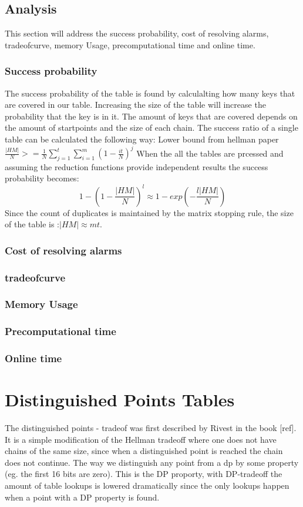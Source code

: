 {\subsection*{Analysis}
This section will address the success probability, cost of resolving alarms, tradeofcurve, memory Usage, precomputational time and online time.


\subsubsection*{Success probability}
The success probability of the table is found by calculalting how many keys that are covered in our table. Increasing the size of the table will increase the probability that the key is in it. The amount of keys that are covered depends on the amount of startpoints and the size of each chain. The success ratio of a single table can be calculated the following way:
Lower bound from hellman paper
$\frac{|HM|}{N}>=\frac{1}{N}\sum^{t}_{j=1}\sum^{m}_{i=1}(1-\frac{it}{N})^{j} $
When the all the tables are prcessed and assuming the reduction functions provide independent results the success probability becomes:
\[1-(1-\frac{|HM|}{N})^l\approx 1- exp(-\frac{l|HM|}{N})\]
Since the count of duplicates is maintained by the matrix stopping rule, the size of the table is :$|HM|\approx mt$.
\subsubsection{Cost of resolving alarms}
\subsubsection{tradeofcurve}
\subsubsection{Memory Usage}
\subsubsection{Precomputational time}
\subsubsection{Online time}

\section{Distinguished Points Tables}
The distinguished points - tradeof was first described by Rivest in
the book [ref]. It is a simple modification of the Hellman tradeoff
where one does not have chains of the same size, since when a
distinguished point is reached the chain does not continue. The way we distinguish any point from a dp by some property (eg. the first 16 bits are zero). This is the DP proporty, with DP-tradeoff the amount of table lookups is lowered dramatically since the only lookups happen when a point with a DP property is found.
}
